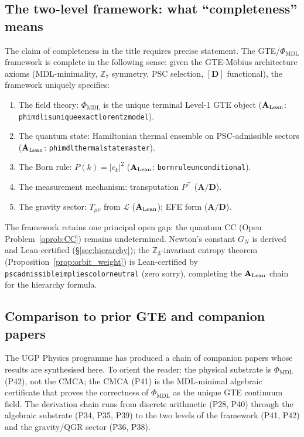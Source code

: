 \documentclass[11pt]{article}
\theoremstyle{remark}
\newcommand{\PHIMDL}{\Phi_{\mathrm{MDL}}}
\newcommand{\ZS}{\mathbb{Z}_7}
\newcommand{\ZZ}{\mathbb{Z}}
\newcommand{\lean}[1]{%
  \penalty-100
  \begingroup\def\_{\textunderscore\allowbreak}\texttt{#1}\endgroup}
\newcommand{\LL}{\mathcal{L}}
\newcommand{\CatAL}{\ensuremath{\textbf{A}_{\rm Lean}}}
\newcommand{\CatAD}{\textbf{A/D}}
\begin{document}
\subsection{The two-level framework: what ``completeness'' means}

The claim of completeness in the title requires precise statement.
The GTE/$\PHIMDL$ framework is complete in the following sense: given the
GTE-Möbius architecture axioms (MDL-minimality, $\ZS$ symmetry, PSC selection,
$[\mathbf{D}]$ functional), the framework uniquely specifies:

\begin{enumerate}[noitemsep]
\item The field theory: $\PHIMDL$ is the unique terminal Level-1 GTE object
  ($\CatAL$: \lean{phimdl\_is\_unique\_exact\_lorentz\_model}).
\item The quantum state: Hamiltonian thermal ensemble on PSC-admissible
  sectors ($\CatAL$: \lean{phimdl\_thermal\_state\_master}).
\item The Born rule: $P(k) = |c_k|^2$ ($\CatAL$: \lean{born\_rule\_unconditional}).
\item The measurement mechanism: transputation $P^\top$ ($\CatAD$).
\item The gravity sector: $T_{\mu\nu}$ from $\LL$ ($\CatAL$); EFE form ($\CatAD$).
\end{enumerate}

The framework retains one principal open gap: the quantum CC
(Open Problem~\ref{oprob:CC}) remains undetermined.  Newton's constant
$G_N$ is derived and Lean-certified (\S\ref{sec:hierarchy}); the
$\ZZ_3$-invariant entropy theorem (Proposition~\ref{prop:orbit_weight}) is
Lean-certified by \lean{psc\_admissible\_implies\_color\_neutral} (zero sorry),
completing the $\CatAL$ chain for the hierarchy formula.

\subsection{Comparison to prior GTE and companion papers}

The UGP Physics programme has produced a chain of companion papers whose results are
synthesised here.  To orient the reader: the physical substrate is
\emph{$\PHIMDL$} (P42), not the CMCA; the CMCA (P41) is the MDL-minimal
algebraic certificate that proves the correctness of $\PHIMDL$ as the unique
GTE continuum field.  The derivation chain runs from discrete arithmetic (P28,
P40) through the algebraic substrate (P34, P35, P39) to the two levels of the
framework (P41, P42) and the gravity/QGR sector (P36, P38).
\end{document}
